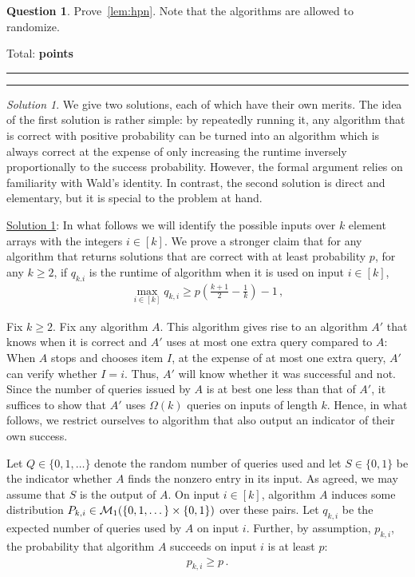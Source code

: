 \documentclass{article}
\DeclareMathOperator*{\1}{\mathbbm{1}}
\newcommand{\0}{\mathbf{0}}
\newcounter{DocPoints} %
\newcounter{QuestionPoints} %
\newcommand{\tpoints}[1]{        %
	\ifthenelse{\isempty{#1}}%
	{%
	}%
	{%
		\addtocounter{DocPoints}{#1}
		\addtocounter{QuestionPoints}{#1}
	}													 %
	\par\mbox{}\par\noindent\hfill {Total: \bf \arabic{QuestionPoints}\xspace points}\par\mbox{}\par\hrule\hrule
	\setcounter{QuestionPoints}{0}
}
\theoremstyle{definition}
\newtheorem{question}{Question}
\theoremstyle{remark}
\newtheorem*{solution*}{Solution}
\theoremstyle{theorem}
\begin{document}
\begin{question}
Prove~\cref{lem:hpn}.
Note that the algorithms are allowed to randomize.
\tpoints{30}
\end{question}
\begin{solution*}
\newcommand{\Perm}{\mathrm{Perm}}
We give two solutions, each of which have their own merits. The idea of the first solution is rather simple:
by repeatedly running it, any algorithm that is correct with positive probability can be turned into an algorithm which is always correct at the expense of only increasing the runtime inversely proportionally to the success probability.
However,
the formal argument relies on familiarity with Wald's identity.
In contrast, the second solution is direct and elementary, but it is special to the problem at hand.

\noindent \underline{Solution 1}:
In what follows we will identify the possible inputs over $k$ element arrays with the integers $i\in [k]$.
We prove a stronger claim that for any algorithm that returns solutions that are correct with at least probability $p$,
for any $k\ge 2$, if $q_{k.i}$ is the runtime of algorithm when it is used on input $i\in [k]$,
\begin{align*}
\max_{i\in [k]} q_{k,i} \ge p \left(\frac{k+1}{2}-\frac{1}{k} \right)-1\,,
\end{align*}

Fix $k\ge 2$.
Fix any algorithm $A$.
This algorithm gives rise to an algorithm $A'$ that knows when it is correct and $A'$ uses at most one extra query compared to $A$: When $A$ stops and chooses item $I$, at the expense of at most one extra query, $A'$ can verify whether $I=i$. Thus, $A'$ will know whether it was successful and not.
Since the number of queries issued by $A$ is at best one less than that of $A'$, it suffices to show that $A'$ uses $\Omega(k)$ queries on inputs of length $k$.
Hence, in what follows, we restrict ourselves to algorithm that also output an indicator of their own success.

Let $Q\in \{0,1,\dots\}$ denote the random number of queries used and let $S\in \{0,1\}$ be the indicator whether $A$ finds the nonzero entry in its input. As agreed, we may assume that $S$ is the output of $A$.
On input $i\in [k]$, algorithm $A$ induces some distribution $P_{k,i}\in \mathcal{M}_1( \{0,1,\dots\} \times \{0,1\})$ over these pairs.
Let $q_{k,i}$ be the expected number of queries used by $A$ on input $i$.
Further, by assumption, $p_{k,i}$, the probability that algorithm $A$ succeeds on input $i$ is at least $p$:
\begin{align}
p_{k,i} \ge p\,.
\label{eq:plb}
\end{align}


\end{solution*}
\end{document}
